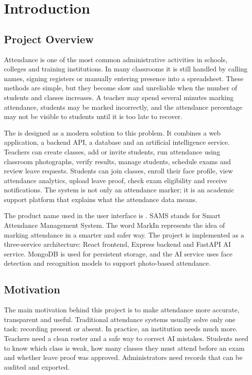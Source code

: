 \chapter{Introduction}
\label{ch:introduction}

\section{Project Overview}
Attendance is one of the most common administrative activities in schools, colleges and training institutions. In many classrooms it is still handled by calling names, signing registers or manually entering presence into a spreadsheet. These methods are simple, but they become slow and unreliable when the number of students and classes increases. A teacher may spend several minutes marking attendance, students may be marked incorrectly, and the attendance percentage may not be visible to students until it is too late to recover.

The \projecttitle{} is designed as a modern solution to this problem. It combines a web application, a backend API, a database and an artificial intelligence service. Teachers can create classes, add or invite students, run attendance using classroom photographs, verify results, manage students, schedule exams and review leave requests. Students can join classes, enroll their face profile, view attendance analytics, upload leave proof, check exam eligibility and receive notifications. The system is not only an attendance marker; it is an academic support platform that explains what the attendance data means.

The product name used in the user interface is \productname. SAMS stands for Smart Attendance Management System. The word MarkIn represents the idea of marking attendance in a smarter and safer way. The project is implemented as a three-service architecture: React frontend, Express backend and FastAPI AI service. MongoDB is used for persistent storage, and the AI service uses face detection and recognition models to support photo-based attendance.

\section{Motivation}
The main motivation behind this project is to make attendance more accurate, transparent and useful. Traditional attendance systems usually solve only one task: recording present or absent. In practice, an institution needs much more. Teachers need a clean roster and a safe way to correct AI mistakes. Students need to know which class is weak, how many classes they must attend before an exam and whether leave proof was approved. Administrators need records that can be audited and exported.

